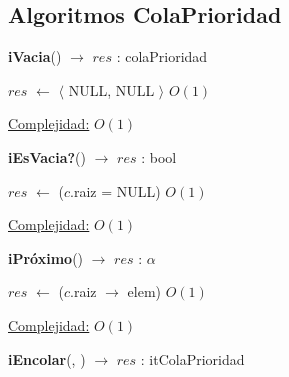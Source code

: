 \begin{Algoritmos}
\subsection{Algoritmos ColaPrioridad}


\begin{algorithm}[H]
{\textbf{iVacia}() $\to$ $res$ : colaPrioridad}
\begin{algorithmic}[1]
    \State $res$ $\gets$  $\langle$ NULL, NULL $\rangle$   \Comment $O(1)$

    \medskip
    \Statex \underline{Complejidad:} $O(1)$
\end{algorithmic}
\end{algorithm}


\begin{algorithm}[H]
{\textbf{iEsVacia?}() $\to$ $res$ : bool}
\begin{algorithmic}[1]
    \State $res$ $\gets$ ($c$.raiz = NULL) \Comment $O(1)$

    \medskip
    \Statex \underline{Complejidad:} $O(1)$
\end{algorithmic}
\end{algorithm}


\begin{algorithm}[H]
{\textbf{iPr\'oximo}() $\to$ $res$ : $\alpha$}
\begin{algorithmic}[1]
    \State $res$ $\gets$ ($c$.raiz $\rightarrow$ elem) \Comment $O(1)$

    \medskip
    \Statex \underline{Complejidad:} $O(1)$
\end{algorithmic}
\end{algorithm}


{\textbf{iEncolar}(, ) $\to$ $res$ : itColaPrioridad}
\begin{algorithmic}[1]


\end{algorithmic}
\end{Algoritmos}
